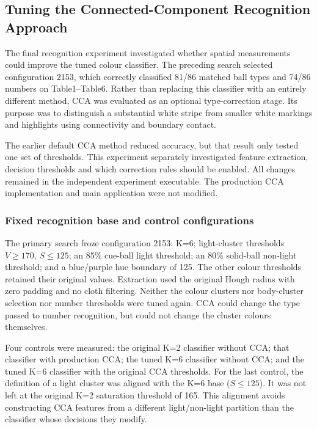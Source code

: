 \subsection{Tuning the Connected-Component Recognition Approach}
\label{sec:cca-search}

The final recognition experiment investigated whether spatial measurements
could improve the tuned colour classifier. The preceding search selected
configuration 2153, which correctly classified 81/86 matched ball types and
74/86 numbers on Table1--Table6. Rather than replacing this classifier with
an entirely different method, CCA was evaluated as an optional type-correction
stage. Its purpose was to distinguish a substantial white stripe from smaller
white markings and highlights using connectivity and boundary contact.

The earlier default CCA method reduced accuracy, but that result only tested
one set of thresholds. This experiment separately investigated feature
extraction, decision thresholds and which correction rules should be enabled.
All changes remained in the independent experiment executable. The production
CCA implementation and main application were not modified.

\subsubsection{Fixed recognition base and control configurations}

The primary search froze configuration 2153: K=6; light-cluster thresholds
$V\geq170$, $S\leq125$; an 85\% cue-ball light threshold; an 80\%
solid-ball non-light threshold; and a blue/purple hue boundary of 125.
The other colour thresholds retained their original values. Extraction
used the original Hough radius with zero padding and no cloth filtering.
Neither the colour clusters nor body-cluster selection nor number thresholds
were tuned again. CCA could change the type passed to number recognition,
but could not change the cluster colours themselves.

Four controls were measured: the original K=2 classifier without CCA; that
classifier with production CCA; the tuned K=6 classifier without CCA; and
the tuned K=6 classifier with the original CCA thresholds. For the last
control, the definition of a light cluster was aligned with the K=6 base
($S\leq125$). It was not left at the original K=2 saturation threshold
of 165. This alignment avoids constructing CCA features from a different
light/non-light partition than the classifier whose decisions they modify.

